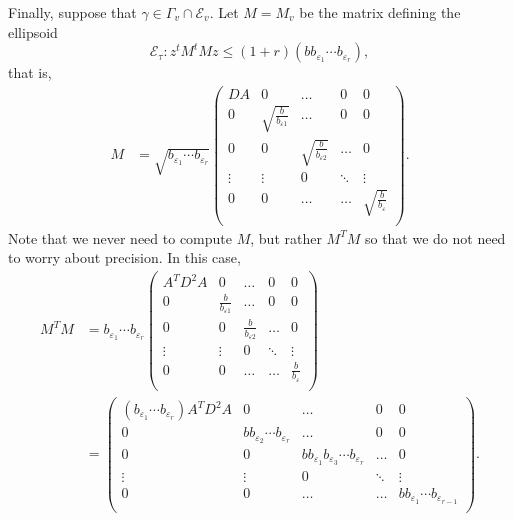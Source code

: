 Finally, suppose that $\gamma\in \Gamma_v\cap \mathcal E_v$. Let $M=M_v$ be the matrix defining the ellipsoid 
\[\mathcal E_\tau: z^tM^tMz\leq (1 + r)(bb_{\varepsilon_1}\cdots b_{\varepsilon_r}),\]
that is,  
\begin{align*}
M &=\sqrt{b_{\varepsilon_1}\cdots b_{\varepsilon_r}}\begin{pmatrix}
	DA & 0 & \dots & 0 & 0\\
	0 & \sqrt{\frac{b}{b_{\varepsilon 1}}} & \dots & 0 & 0\\
	0 & 0  & \sqrt{\frac{b}{b_{\varepsilon 2}}} & \dots & 0\\
	\vdots & \vdots &0 &  \ddots & \vdots\\ 
	0 & 0 & \dots & \dots & \sqrt{\frac{b}{b_{\varepsilon}}} \\
	\end{pmatrix}.
\end{align*}	
Note that we never need to compute $M$, but rather $M^TM$ so that we do not need to worry about precision. In this case, 
\begin{align*}
M^TM &= b_{\varepsilon_1}\cdots b_{\varepsilon_r}\begin{pmatrix}
	A^TD^2A & 0 & \dots & 0 & 0\\
	0 & \frac{b}{b_{\varepsilon 1}} & \dots & 0 & 0\\
	0 & 0  & \frac{b}{b_{\varepsilon 2}} & \dots & 0\\
	\vdots & \vdots &0 &  \ddots & \vdots\\ 
	0 & 0 & \dots & \dots & \frac{b}{b_{\varepsilon}} \\
	\end{pmatrix}\\
	& = \begin{pmatrix}
	(b_{\varepsilon_1}\cdots b_{\varepsilon_r})A^TD^2A & 0 & \dots & 0 & 0\\
	0 & b b_{\varepsilon_2}\cdots b_{\varepsilon_r} & \dots & 0 & 0\\
	0 & 0  & bb_{\varepsilon_1}b_{\varepsilon_3}\cdots b_{\varepsilon_r} & \dots & 0\\
	\vdots & \vdots &0 &  \ddots & \vdots\\ 
	0 & 0 & \dots & \dots & bb_{\varepsilon_1}\cdots b_{\varepsilon_{r-1}} \\
	\end{pmatrix}.
\end{align*}	
	
